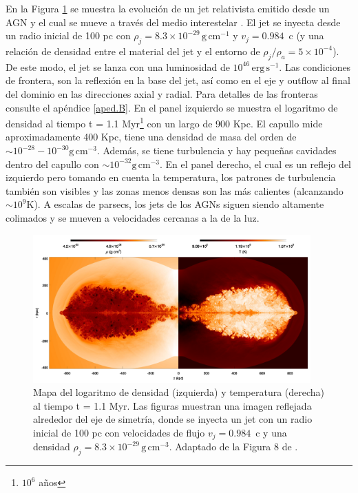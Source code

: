 \documentclass[12pt,a4paper]{book}
\begin{document}
En la Figura \ref{fig:jet_agn} se muestra la evolución de un jet relativista emitido desde un AGN y el cual se mueve a través del medio interestelar \citep{2011ApJ...743...42P}. El jet se inyecta desde un 
radio inicial de 100 pc con $\rho_j = 8.3 \times 10^{-29} \, \text{g}\,\text{cm}^{-1}$ y $v_j = 0.984$~c (y una relación de densidad entre el material del jet y el entorno de $\rho_j / \rho_a = 5\times10^{-4}$). De este modo, 
el jet se lanza con una luminosidad de $10^{46} \, \text{erg} \, \text{s}^{-1}$. Las condiciones de frontera, son la reflexión en la base del jet, así como en el eje y outflow al final del dominio en 
las direcciones axial y radial. Para detalles de las fronteras consulte el apéndice \ref{aped.B}. En el panel izquierdo se muestra el logaritmo de densidad al tiempo t = 1.1 Myr\footnote{$10^6$ años} con un largo de 900 Kpc. 
El capullo mide aproximadamente 400 Kpc, tiene una densidad de masa del 
orden de $\sim10^{-28}-10^{-30} \text{g} \, \text{cm}^{-3}$. Además, se tiene turbulencia y hay pequeñas cavidades dentro del capullo con $\sim10^{-32} \text{g} \, \text{cm}^{-3}$. En el panel derecho, el cual es un reflejo
del izquierdo pero tomando en 
cuenta la temperatura, los patrones de turbulencia también son visibles y las zonas menos densas son las más calientes (alcanzando $\sim 10^9$K). A escalas de parsecs, los jets de los AGNs siguen siendo altamente colimados y 
se mueven a velocidades cercanas a la de la luz.

\begin{figure}
  \begin{center}
    \includegraphics[width=0.95\textwidth]{Figuras/capitulo_1/jet_agn.png}
  \end{center}
  \caption{Mapa del logaritmo de densidad (izquierda) y temperatura (derecha) al tiempo t = 1.1 Myr. Las figuras muestran una imagen reflejada alrededor del eje de simetría, donde se inyecta un jet con un radio inicial 
  de 100 pc con velocidades de flujo $v_j = 0.984$~c y una densidad $\rho_j = 8.3 \times 10^{-29} \, \text{g} \,\text{cm}^{-3}$. Adaptado de la Figura 8 de \citet{Marti2019}.}
  \label{fig:jet_agn}
\end{figure}
\end{document}
